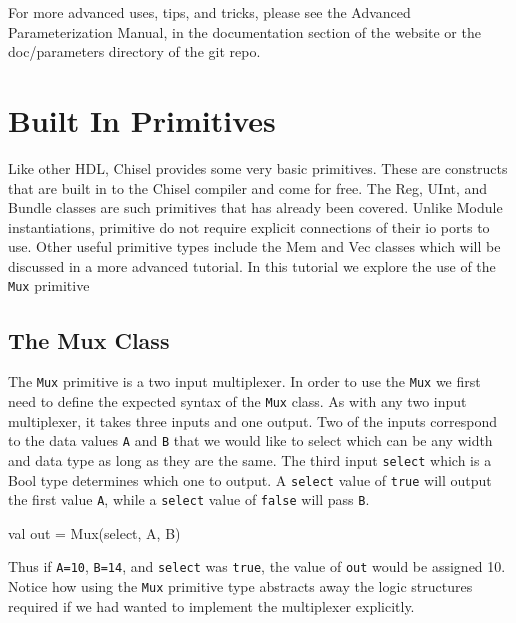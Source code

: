 For more advanced uses, tips, and tricks, please see the Advanced Parameterization Manual, in the documentation section of the website or the doc/parameters directory of the git repo.

\section{Built In Primitives}

Like other HDL, Chisel provides some very basic primitives. These are constructs that are built in to the Chisel compiler and come for free. The Reg, UInt, and Bundle classes are such primitives that has already been covered. Unlike Module instantiations, primitive do not require explicit connections of their io ports to use. Other useful primitive types include the Mem and Vec classes which will be discussed in a more advanced tutorial. In this tutorial we explore the use of the \verb+Mux+ primitive

\subsection{The Mux Class}

The \verb+Mux+ primitive is a two input multiplexer. In order to use the \verb+Mux+ we first need to define the expected syntax of the \verb+Mux+ class. As with any two input multiplexer, it takes three inputs and one output. Two of the inputs correspond to the data values \verb+A+ and \verb+B+ that we would like to select which can be any width and data type as long as they are the same. The third input \verb+select+ which is a Bool type determines which one to output.
A \verb+select+ value of \verb+true+ will output the first value \verb+A+, while a \verb+select+ value of \verb+false+ will pass \verb+B+.

\begin{scala}
val out = Mux(select, A, B)
\end{scala}

Thus if \verb+A=10+, \verb+B=14+, and \verb+select+ was \verb+true+, the value of \verb+out+ would be assigned 10. Notice how using the \verb+Mux+ primitive type abstracts away the logic structures required if we had wanted to implement the multiplexer explicitly.

\subsection{}

